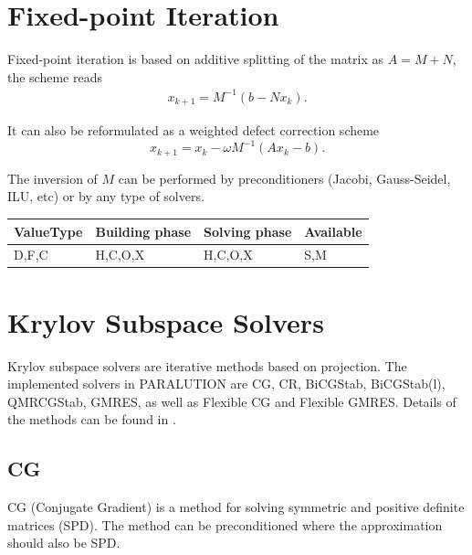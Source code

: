 \section{Fixed-point Iteration}


Fixed-point iteration is based on additive splitting of the matrix as $A=M+N$, the scheme reads
%
\begin{eqnarray}
 x_{k+1}=M^{-1}(b-N x_{k}).
\end{eqnarray}

It can also be reformulated as a weighted defect correction scheme 
\begin{equation}
 x_{k+1}=x_{k} - \omega M^{-1}(Ax_{k}-b).
\end{equation}

The inversion of $M$ can be performed by preconditioners (Jacobi, Gauss-Seidel, ILU, etc) or by any type of solvers. 

\begin{table}[H]
\begin{tabular}{l|l|l|l}
\multicolumn{1}{c|}{ValueType} & Building phase & Solving phase & Available \\ \hline
D,F,C                          & H,C,O,X        & H,C,O,X       & S,M      
\end{tabular}
\end{table}







\section{Krylov Subspace Solvers}

Krylov subspace solvers are iterative methods based on projection. The implemented solvers in PARALUTION are CG, CR, BiCGStab, BiCGStab(l), QMRCGStab, GMRES, as well as Flexible CG and Flexible GMRES. Details of the methods can be found in \cite{SAAD, templates, Demmel, IDR1, IDR2}.

\subsection{CG}

CG (Conjugate Gradient) is a method for solving symmetric and positive definite matrices (SPD). The method can be preconditioned where the approximation should also be SPD.



